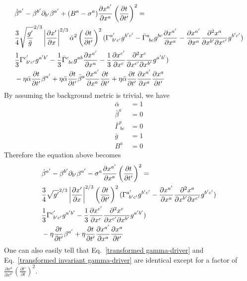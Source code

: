 \documentclass{article}
\begin{document}
\begin{align*}
&{\dot \beta}^{a'} - \beta^{b'}\partial_{b'}\beta^{a'} + (B^{a} - \sigma^{a})\frac{\partial x^{a'}}{\partial x^{a}}\left(\frac{\partial t}{\partial t'}\right)^{2} = \notag\\
& \frac{3}{4}\sqrt{\frac{g'}{{\bar g}}}^{2/3}\left|\frac{\partial x'}{\partial x}\right|^{2/3}{\bar \alpha}^{2}\left(\frac{\partial t}{\partial t'}\right)^{2}(\Gamma^{a'}_{~b'c'}g^{b'c'} - {\bar \Gamma}^{a}_{~bc}g^{bc}\frac{\partial x^{a'}}{\partial x^{a}} - \frac{\partial x^{a'}}{\partial x^{a}}\frac{\partial^{2}x^{a}}{\partial x^{b'}\partial x^{c'}}g^{b'c'} )\\
&\frac{1}{3}\Gamma^{c'}_{~b'c'}g^{a'b'} - \frac{1}{3}{\bar\Gamma}^{c}_{~bc}g^{ab}\frac{\partial x^{a'}}{\partial x^{a}} - \frac{1}{3}\frac{\partial x^{c'}}{\partial x^{c}}\frac{\partial^{2}x^{c}}{\partial x^{c'}\partial x^{b'}}g^{a'b'})\\
& - \eta {\bar\alpha}\frac{\partial t}{\partial t'}\beta^{a'} + \eta {\bar\alpha}\frac{\partial t}{\partial t'}{\bar\beta}^{a}\frac{\partial x^{a'}}{\partial x^{a}}\frac{\partial t}{\partial t'} + \eta {\bar \alpha} \frac{\partial t}{\partial t'}\frac{\partial x^{a'}}{\partial x^{a}}\frac{\partial x^{a}}{\partial t'}
\end{align*}
By assuming the background metric is trivial, we have
\begin{align*}
{\bar \alpha} & = 1\\
{\bar \beta}^{a} & = 0\\
{\bar \Gamma}^{a}_{~bc} & = 0\\
{\bar g} & = 1\\
B^{a} & = 0
\end{align*}
Therefore the equation above becomes
\begin{align}\label{transformed invariant gamma-driver}
&{\dot \beta}^{a'} - \beta^{b'}\partial_{b'}\beta^{a'} - \sigma^{a}\frac{\partial x^{a'}}{\partial x^{a}}\left(\frac{\partial t}{\partial t'}\right)^{2} = \notag\\
& \frac{3}{4}\sqrt{g'}^{2/3}\left|\frac{\partial x'}{\partial x}\right|^{2/3}\left(\frac{\partial t}{\partial t'}\right)^{2}(\Gamma^{a'}_{~b'c'}g^{b'c'} - \frac{\partial x^{a'}}{\partial x^{a}}\frac{\partial^{2}x^{a}}{\partial x^{b'}\partial x^{c'}}g^{b'c'} )\notag\\
&\frac{1}{3}\Gamma^{c'}_{~b'c'}g^{a'b'}  - \frac{1}{3}\frac{\partial x^{c'}}{\partial x^{c}}\frac{\partial^{2}x^{c}}{\partial x^{c'}\partial x^{b'}}g^{a'b'})\notag\\
& - \eta\frac{\partial t}{\partial t'}\beta^{a'} + \eta \frac{\partial t}{\partial t'}\frac{\partial x^{a'}}{\partial x^{a}}\frac{\partial x^{a}}{\partial t'}
\end{align}
One can also easily tell that Eq.~\ref{transformed gamma-driver} and Eq.~\ref{transformed invariant gamma-driver} are identical except for a factor of $\frac{\partial x^{a}}{\partial x^{a'}}\left(\frac{\partial t'}{\partial t}\right)^{2}$.
\end{document}
